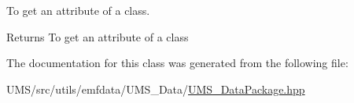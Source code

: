 To get an attribute of a class. 

\begin{DoxyReturn}{Returns}
To get an attribute of a class 
\end{DoxyReturn}


The documentation for this class was generated from the following file:\begin{DoxyCompactItemize}
\item 
UMS/src/utils/emfdata/UMS\_\-Data/\hyperlink{UMS__DataPackage_8hpp}{UMS\_\-DataPackage.hpp}\end{DoxyCompactItemize}
